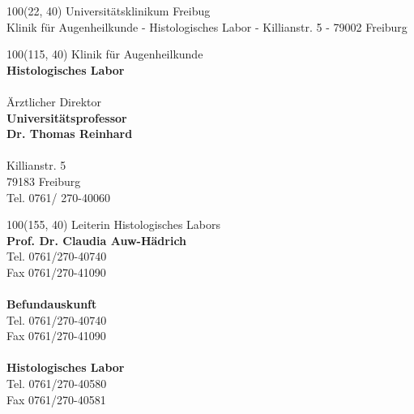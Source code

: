 \documentclass[12pt]{g-brief}
\begin{document}
\baselineskip10pt

\textblockorigin{0in}{0in}
\setlength{\TPHorizModule}{1mm}
\setlength{\TPVertModule}{1mm}

{

\begin{textblock}{100}(22, 40) 
\noindent 
\scriptsize
Universitätsklinikum Freibug\\
\tiny
Klinik für Augenheilkunde - Histologisches Labor - Killianstr. 5 - 79002 Freiburg
\end{textblock}
}



{
\scriptsize
\begin{textblock}{100}(115, 40) 
Klinik für Augenheilkunde \\
\textbf{Histologisches Labor}\\\\
Ärztlicher Direktor\\
\textbf{Universitätsprofessor\\
Dr. Thomas Reinhard}\\\\
Killianstr. 5\\
79183 Freiburg\\
Tel. 0761/ 270-40060\\
\end{textblock}
}

{
\scriptsize
\begin{textblock}{100}(155, 40) 
Leiterin Histologisches Labors\\
\textbf{Prof. Dr. Claudia Auw-Hädrich}\\
Tel. 0761/270-40740\\
Fax 0761/270-41090\\\\
\textbf{Befundauskunft}\\
Tel. 0761/270-40740\\
Fax 0761/270-41090\\\\
\textbf{Histologisches Labor}\\
Tel. 0761/270-40580\\
Fax 0761/270-40581
\end{textblock}
}

\begin{g-brief}
 \end{g-brief}
\end{document}
